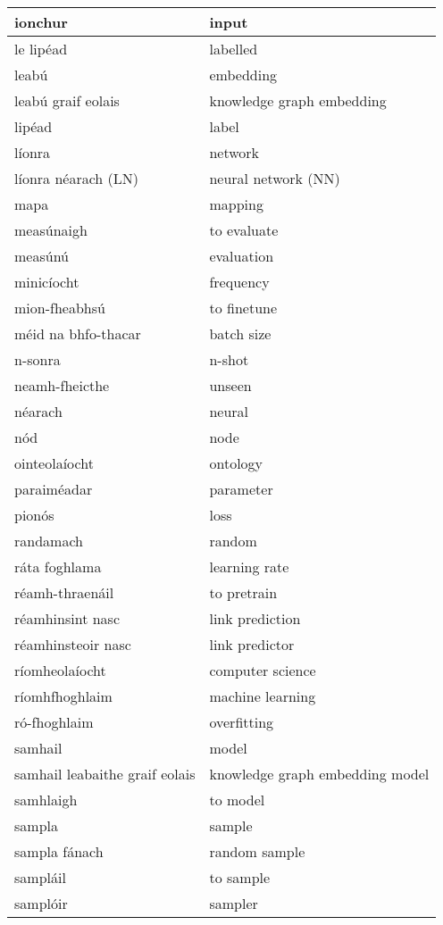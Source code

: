 \documentclass{article}
\begin{document}
\begin{longtable}{|l|l|}
		ionchur&input\\ \hline 
		le lipéad&labelled\\ \hline 
		leabú&embedding\\ \hline 
		leabú graif eolais&knowledge graph embedding\\ \hline 
		lipéad&label\\ \hline 
		líonra&network\\ \hline 
		líonra néarach (LN)&neural network (NN)\\ \hline 
		mapa&mapping\\ \hline 
		measúnaigh&to evaluate\\ \hline 
		measúnú&evaluation\\ \hline 
		minicíocht&frequency\\ \hline 
		mion-fheabhsú&to finetune\\ \hline 
		méid na bhfo-thacar&batch size\\ \hline 
		n-sonra&n-shot\\ \hline 
		neamh-fheicthe&unseen\\ \hline 
		néarach&neural\\ \hline 
		nód&node\\ \hline 
		ointeolaíocht&ontology\\ \hline 
		paraiméadar&parameter\\ \hline 
		pionós&loss\\ \hline 
		randamach&random\\ \hline 
		ráta foghlama&learning rate\\ \hline 
		réamh-thraenáil&to pretrain\\ \hline 
		réamhinsint nasc&link prediction\\ \hline 
		réamhinsteoir nasc&link predictor\\ \hline 
		ríomheolaíocht&computer science\\ \hline 
		ríomhfhoghlaim&machine learning\\ \hline 
		ró-fhoghlaim&overfitting\\ \hline 
		samhail&model\\ \hline 
		samhail leabaithe graif eolais&knowledge graph embedding model\\ \hline 
		samhlaigh&to model\\ \hline 
		sampla&sample\\ \hline 
		sampla fánach&random sample\\ \hline 
		sampláil&to sample\\ \hline 
		samplóir&sampler\\ \hline 

\end{longtable}
\end{document}
